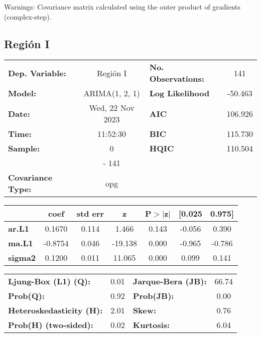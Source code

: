 \documentclass{article}%
\begin{document}
Warnings: \newline
 [1] Covariance matrix calculated using the outer product of gradients (complex-step).%
\subsection*{Región I}%
\begin{center}
\begin{tabular}{lclc}
\toprule
\textbf{Dep. Variable:}          &     Región I     & \textbf{  No. Observations:  } &    141      \\
\textbf{Model:}                  &  ARIMA(1, 2, 1)  & \textbf{  Log Likelihood     } &  -50.463    \\
\textbf{Date:}                   & Wed, 22 Nov 2023 & \textbf{  AIC                } &  106.926    \\
\textbf{Time:}                   &     11:52:30     & \textbf{  BIC                } &  115.730    \\
\textbf{Sample:}                 &        0         & \textbf{  HQIC               } &  110.504    \\
\textbf{}                        &       - 141      & \textbf{                     } &             \\
\textbf{Covariance Type:}        &       opg        & \textbf{                     } &             \\
\bottomrule
\end{tabular}
\begin{tabular}{lcccccc}
                & \textbf{coef} & \textbf{std err} & \textbf{z} & \textbf{P$> |$z$|$} & \textbf{[0.025} & \textbf{0.975]}  \\
\midrule
\textbf{ar.L1}  &       0.1670  &        0.114     &     1.466  &         0.143        &       -0.056    &        0.390     \\
\textbf{ma.L1}  &      -0.8754  &        0.046     &   -19.138  &         0.000        &       -0.965    &       -0.786     \\
\textbf{sigma2} &       0.1200  &        0.011     &    11.065  &         0.000        &        0.099    &        0.141     \\
\bottomrule
\end{tabular}
\begin{tabular}{lclc}
\textbf{Ljung-Box (L1) (Q):}     & 0.01 & \textbf{  Jarque-Bera (JB):  } & 66.74  \\
\textbf{Prob(Q):}                & 0.92 & \textbf{  Prob(JB):          } &  0.00  \\
\textbf{Heteroskedasticity (H):} & 2.01 & \textbf{  Skew:              } &  0.76  \\
\textbf{Prob(H) (two-sided):}    & 0.02 & \textbf{  Kurtosis:          } &  6.04  \\
\bottomrule
\end{tabular}
\end{center}
\end{document}
